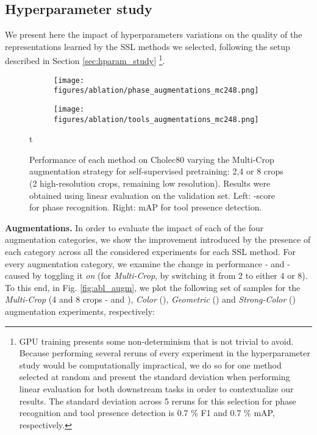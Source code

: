 \documentclass[times,twocolumn,final]{elsarticle}
\begin{document}
\subsection{Hyperparameter study}
\label{sec:hyperparameter_study}
We present here the impact of hyperparameters variations on the quality of the representations learned by the SSL methods we selected, following the setup described in Section \ref{sec:hparam_study} \footnote{GPU training presents some non-determinism that is not trivial to avoid. Because performing several reruns of every experiment in the hyperparameter study would be computationally impractical, we do so for one method selected at random and present the standard deviation when performing linear evaluation for both downstream tasks in order to contextualize our results. The standard deviation across 5 reruns for this selection for phase recognition and tool presence detection is 0.7 \% F1 and 0.7 \% mAP, respectively.}.

\begin{figure}[h!]
  \begin{subfigure}
    \centering
    \texttt{[image: figures/ablation/phase\_augmentations\_mc248.png]}
  \end{subfigure}
  \begin{subfigure}
    \centering
    \texttt{[image: figures/ablation/tools\_augmentations\_mc248.png]}  
  \end{subfigure}
  \caption{Performance of each method on Cholec80 varying the Multi-Crop augmentation strategy for self-supervised pretraining: 2,4 or 8 crops (2 high-resolution crops, remaining low resolution). Results were obtained using linear evaluation on the validation set. Left: -score for phase recognition. Right: mAP for tool presence detection.}
  \label{fig:abl_mc}t
\end{figure}

\noindent\textbf{Augmentations.}
In order to evaluate the impact of each of the four augmentation categories, we show the improvement introduced by the presence of each category across all the considered experiments for each SSL method. For every augmentation category, we examine the change in performance -  and  - caused by toggling it \textit{on} (for \textit{Multi-Crop}, by switching it from 2 to either 4 or 8). To this end, in Fig. \ref{fig:abl_augm}, we plot the following set of samples for the \textit{Multi-Crop} (4 and 8 crops -  and ), \textit{Color} (), \textit{Geometric} () and \textit{Strong-Color} () augmentation experiments, respectively:
\end{document}
